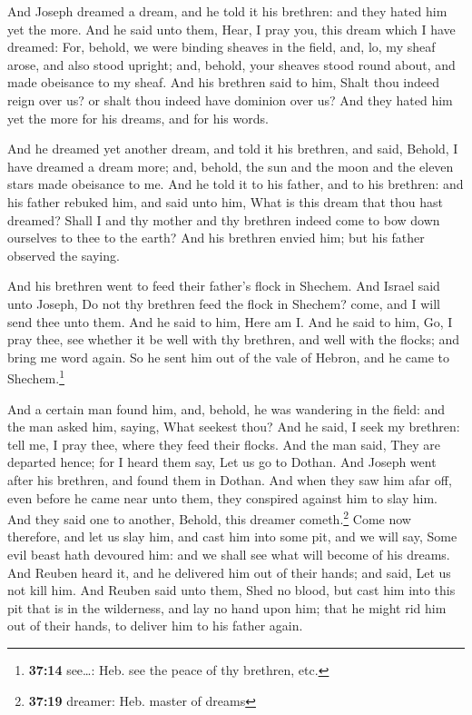  And Joseph dreamed a dream, and he told it his brethren:
and they hated him yet the more.  And he said unto them,
Hear, I pray you, this dream which I have dreamed:  For,
behold, we were binding sheaves in the field, and, lo, my sheaf arose,
and also stood upright; and, behold, your sheaves stood round about, and
made obeisance to my sheaf.  And his brethren said to him,
Shalt thou indeed reign over us? or shalt thou indeed have dominion over
us? And they hated him yet the more for his dreams, and for his words.

 And he dreamed yet another dream, and told it his
brethren, and said, Behold, I have dreamed a dream more; and, behold,
the sun and the moon and the eleven stars made obeisance to me.
 And he told it to his father, and to his brethren: and
his father rebuked him, and said unto him, What is this dream that thou
hast dreamed? Shall I and thy mother and thy brethren indeed come to bow
down ourselves to thee to the earth?  And his brethren
envied him; but his father observed the saying.

 And his brethren went to feed their father's flock in
Shechem.  And Israel said unto Joseph, Do not thy
brethren feed the flock in Shechem? come, and I will send thee unto
them. And he said to him, Here am I.  And he said to him,
Go, I pray thee, see whether it be well with thy brethren, and well with
the flocks; and bring me word again. So he sent him out of the vale of
Hebron, and he came to Shechem.\footnote{\textbf{37:14} see\ldots: Heb.
  see the peace of thy brethren, etc.}

 And a certain man found him, and, behold, he was
wandering in the field: and the man asked him, saying, What seekest
thou?  And he said, I seek my brethren: tell me, I pray
thee, where they feed their flocks.  And the man said,
They are departed hence; for I heard them say, Let us go to Dothan. And
Joseph went after his brethren, and found them in Dothan.
 And when they saw him afar off, even before he came near
unto them, they conspired against him to slay him.  And
they said one to another, Behold, this dreamer cometh.\footnote{\textbf{37:19}
  dreamer: Heb. master of dreams}  Come now therefore,
and let us slay him, and cast him into some pit, and we will say, Some
evil beast hath devoured him: and we shall see what will become of his
dreams.  And Reuben heard it, and he delivered him out of
their hands; and said, Let us not kill him.  And Reuben
said unto them, Shed no blood, but cast him into this pit that is in the
wilderness, and lay no hand upon him; that he might rid him out of their
hands, to deliver him to his father again.

